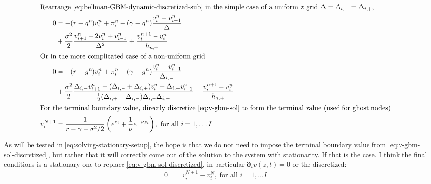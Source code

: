 \documentclass[11pt]{article}
\newcommand{\D}[1][]{\ensuremath{\boldsymbol{\partial}_{#1}}}
\begin{document}
\begin{align}
\intertext{Rearrange \cref{eq:bellman-GBM-dynamic-discretized-sub} in the simple case of a uniform $z$ grid $\Delta =  \Delta_{i,-} = \Delta_{i,+}$,}
0 &= -(r - g^n) v_i^n + \pi^n_i + (\gamma - g^n)\frac{v_i^n - v_{i-1}^n}{\Delta} \nonumber\\
&+ \frac{\sigma^2}{2}\frac{v_{i+1}^n - 2 v_i^n + v_{i-1}^n}{\Delta^2} + \frac{v_i^{n+1} - v_i^n}{h_{n,+}} \label{eq:bellman-GBM-dynamic-discretized-uniform}\\
\intertext{Or in the more complicated case of a non-uniform grid}
0 &= -(r - g^n) v_i^n + \pi^n_i + (\gamma - g^n)\frac{v_i^n - v_{i-1}^n}{\Delta_{i,-}} \nonumber\\
&+ \frac{\sigma^2}{2}\frac{\Delta_{i,-}v^n_{i+1} - (\Delta_{i,-}+\Delta_{i,+})v^n_i+\Delta_{i,+}v^n_{i-1}}{\frac{1}{2}(\Delta_{i,+}+\Delta_{i,-})\Delta_{i,+}\Delta_{i,-}}+ \frac{v_i^{n+1} - v_i^n}{h_{n,+}} \label{eq:bellman-GBM-dynamic-discretized}\\
\intertext{For the terminal boundary value, directly discretize \cref{eq:v-gbm-sol} to form the terminal value (used for ghost nodes)}
	v^{N+1}_i &= \frac{1}{r-\gamma - \sigma^2/2}\left(e^{z_i} + \frac{1}{\nu} e^{-\nu z_i}\right), \text{ for all }i = 1,\ldots I\label{eq:v-gbm-sol-discretized}
\end{align}	

As will be tested in \cref{eq:solving-stationary-setup}, the hope is that we do not need to impose the terminal boundary value from \cref{eq:v-gbm-sol-discretized}, but rather that it will correctly come out of the solution to the system with stationarity.  If that is the case, I think the final conditions is a stationary one to replace \cref{eq:v-gbm-sol-discretized}, in particular $\D[t]v(z,t) = 0$ or the discretized:
\begin{align}
	0 &= v^{N+1}_i - v^N_i,\text{ for all }i = 1,\ldots I
\end{align}
\end{document}

